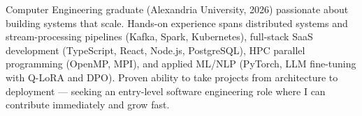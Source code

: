 

\begin{cvparagraph}
\sloppy
Computer Engineering graduate (Alexandria University, 2026) passionate about building systems that scale. Hands-on experience spans distributed systems and stream-processing pipelines (Kafka, Spark, Kubernetes), full-stack SaaS development (TypeScript, React, Node.js, PostgreSQL), HPC parallel programming (OpenMP, MPI), and applied ML/NLP (PyTorch, LLM fine-tuning with Q-LoRA and DPO). Proven ability to take projects from architecture to deployment — seeking an entry-level software engineering role where I can contribute immediately and grow fast.
\fussy
\end{cvparagraph}
